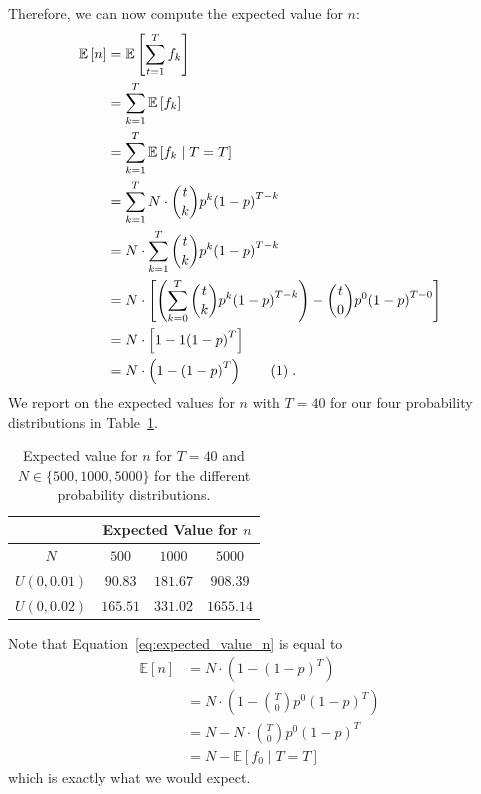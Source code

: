 \documentclass{article}
\newcommand{\stepandtag}{%
  \refstepcounter{equation}%
  \tag{\theequation}%
}
\begin{document}
Therefore, we can now compute the expected value for $n$:
\begin{align*}
    \mathbb{E}\left[ n \right] &= \mathbb{E}\left[ \sum_{t=1}^T f_k \right] \\
    &= \sum_{k=1}^T \mathbb{E}\left[ f_k \right] \\
    &= \sum_{k=1}^T \mathbb{E}\left[ f_k \mid T=T\right] \\
    &= \sum_{k=1}^T N \cdot \binom{t}{k} p^k {(1-p)}^{T-k} \\
    &= N \cdot \sum_{k=1}^T \binom{t}{k} p^k {(1-p)}^{T-k} \\
    &= N \cdot \left[ \left( \sum_{k=0}^T \binom{t}{k} p^k {(1-p)}^{T-k} \right) - \binom{t}{0} p^0 {(1-p)}^{T-0}  \right] \\
    &= N \cdot \left[ 1 - 1{(1-p)}^{T} \right]  \\
    &= N \cdot \left( 1 - {(1-p)}^T \right) \stepandtag \label{eq:expected_value_n}\;.
\end{align*}
We report on the expected values for $n$ with $T=40$ for our four probability distributions in Table~\ref{tab:expected_value_n}.
\begin{table}[t]
    \centering
    \begin{tabular}{c|c c c}
        \toprule
         & \multicolumn{3}{c}{Expected Value for $n$} \\
        \midrule
        $N$ & $500$ & $1000$ & $5000$ \\
        \midrule
        $U(0, 0.01)$ & $90.83$ & $181.67$ & $908.39$\\
        $U(0, 0.02)$ & $165.51$ & $331.02$ & $1655.14$\\
    \end{tabular}
    \caption{Expected value for $n$ for $T=40$ and $N \in \{500, 1000, 5000\}$ for the different probability distributions.}
    \label{tab:expected_value_n}
\end{table}
Note that Equation~\ref{eq:expected_value_n} is equal to 
\begin{align*}
    \mathbb{E}\left[ n \right] &= N \cdot \left( 1 - {(1-p)}^T \right) \\
    &= N \cdot \left( 1 - \binom{T}{0} p^0 (1-p)^T \right) \\
    &= N - N \cdot \binom{T}{0} p^0 (1-p)^T \\
    &= N - \mathbb{E}\left[ f_0 \mid T=T \right] 
\end{align*}
which is exactly what we would expect.
\end{document}

